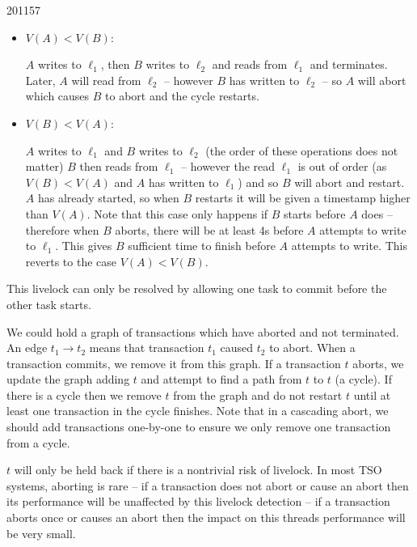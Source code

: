 \documentclass[10pt,\jkfside,a4paper]{article}
\begin{document}
\begin{examquestion}{2011}{5}{7}
\begin{enumerate}[label=(\alph*)]
\begin{itemize}

\item $V(A) < V(B)$:

$A$ writes to $\ell_1$, then $B$ writes to $\ell_2$ and reads from
$\ell_1$ and terminates. Later, $A$ will read from $\ell_2$ -- however $B$
has written to $\ell_2$ -- so $A$ will abort which causes $B$ to abort and the
cycle restarts.

\item $V(B) < V(A)$:

$A$ writes to $\ell_1$ and $B$ writes to $\ell_2$ (the order of these
operations does not matter) $B$ then reads from $\ell_1$ -- however the
read $\ell_1$ is out of order (as $V(B) < V(A)$ and $A$ has written to
$\ell_1$) and so $B$ will abort and restart.
$A$ has already started, so when $B$ restarts it will be given a timestamp
higher than $V(A)$. Note that this case only happens if $B$ starts before
$A$ does -- therefore when $B$ aborts, there will be at least 4s before $A$
attempts to write to $\ell_1$. This gives $B$ sufficient time to finish
before $A$ attempts to write. This reverts to the case $V(A) < V(B)$.

\end{itemize}

This livelock can only be resolved by allowing one task to commit before the
other task starts.

We could hold a graph of transactions which have aborted and not terminated.
An edge $t_1 \rightarrow t_2$ means that transaction $t_1$ caused $t_2$ to
abort. When a transaction commits, we remove it from this graph. If a
transaction $t$ aborts, we update the graph adding $t$ and attempt to find a
path from $t$ to $t$ (a cycle). If there is a cycle then we remove $t$ from
the graph and do not restart $t$ until at least one transaction in the
cycle finishes. Note that in a cascading abort, we should add transactions
one-by-one to ensure we only remove one transaction from a cycle.

$t$ will only be held back if there is a nontrivial risk of livelock. In
most TSO systems, aborting is rare -- if a transaction does not abort or
cause an abort then its performance will be unaffected by this livelock
detection -- if a transaction aborts once or causes an abort then
the impact on this threads performance will be very small.

\end{enumerate}

\end{examquestion}
\end{document}
